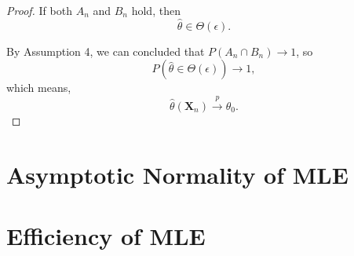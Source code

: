 \begin{proof}
    If both $A_{n}$ and $B_{n}$ hold, then
    \begin{equation*}
        \hat{\theta}\in\Theta(\epsilon).
    \end{equation*}

    By Assumption 4, we can concluded that $P\left(A_{n}\cap B_{n}\right)\rightarrow 1$, so
    \begin{equation*}
        P(\hat{\theta}\in\Theta(\epsilon))\rightarrow 1,
    \end{equation*}
    which means,
    \begin{equation*}
        \hat{\theta}\left(\textbf{X}_{n}\right)\stackrel{p}{\rightarrow}\theta_{0}.
    \end{equation*}
\end{proof}

\section{Asymptotic Normality of MLE}

\section{Efficiency of MLE}
